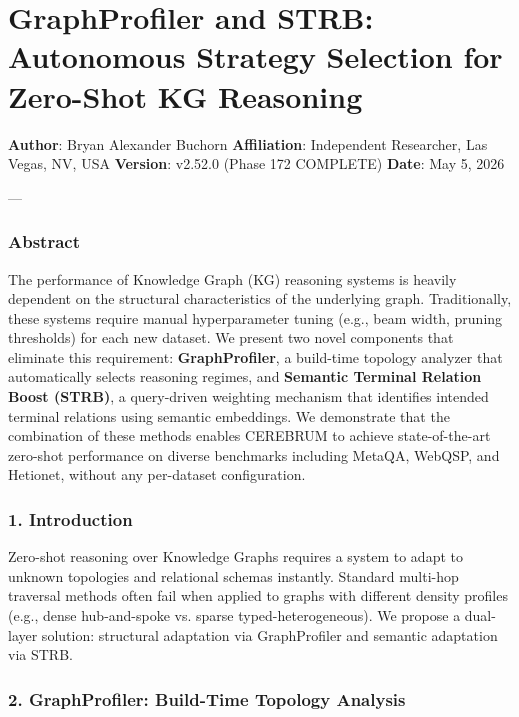 \section{GraphProfiler and STRB: Autonomous Strategy Selection for Zero-Shot KG Reasoning}

\textbf{Author}: Bryan Alexander Buchorn  
\textbf{Affiliation}: Independent Researcher, Las Vegas, NV, USA  
\textbf{Version}: v2.52.0 (Phase 172 COMPLETE)
\textbf{Date}: May 5, 2026

---

\subsubsection{Abstract}

The performance of Knowledge Graph (KG) reasoning systems is heavily dependent on the structural chara\-cteristics of the underlying graph. Tradit\-ionally, these systems require manual hyper\-parameter tuning (e.g., beam width, pruning thresholds) for each new dataset. We present two novel components that eliminate this requirement: \textbf{GraphProfiler}, a build-time topology analyzer that autom\-atically selects reasoning regimes, and \textbf{Semantic Terminal Relation Boost (STRB)}, a query-driven weighting mechanism that identifies intended terminal relations using semantic embeddings. We demonstrate that the combination of these methods enables CEREBRUM to achieve state-of-the-art zero-shot performance on diverse benchmarks including MetaQA, WebQSP, and Hetionet, without any per-dataset confi\-guration.

\subsubsection{1. Introd\-uction}

Zero-shot reasoning over Knowledge Graphs requires a system to adapt to unknown topologies and relational schemas instantly. Standard multi-hop traversal methods often fail when applied to graphs with different density profiles (e.g., dense hub-and-spoke vs. sparse typed-heter\-ogeneous). We propose a dual-layer solution: structural adaptation via GraphProfiler and semantic adaptation via STRB.

\subsubsection{2. GraphProfiler: Build-Time Topology Analysis}

